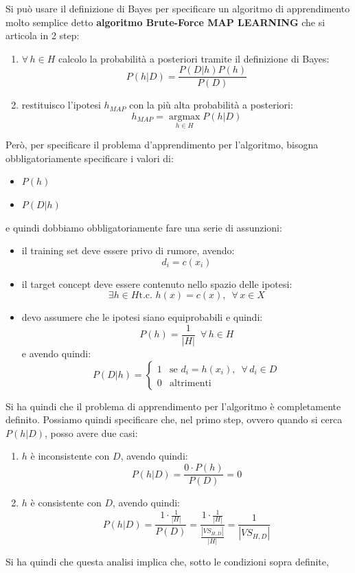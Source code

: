 Si può usare il definizione di Bayes per specificare un algoritmo di apprendimento
molto semplice detto \textbf{algoritmo Brute-Force MAP LEARNING} che si articola
in 2 step:
\begin{enumerate}
  \item $\forall\, h\in H$ calcolo la probabilità a posteriori tramite il definizione
  di Bayes:
  \[P(h|D)=\frac{P(D|h)P(h)}{P(D)}\]
  
  \item restituisco l'ipotesi $h_{MAP}$ con la più alta probabilità a
  posteriori:
  \[h_{MAP}=\operatorname*{argmax}_{h\in H}P(h|D)\]
\end{enumerate}
Però, per specificare il problema d'apprendimento per l'algoritmo, bisogna
obbligatoriamente specificare i valori di:
\begin{itemize}
  \item $P(h)$
  \item $P(D|h)$
\end{itemize}
e quindi dobbiamo obbligatoriamente fare una serie di assunzioni:
\begin{itemize}
  \item il training set deve essere privo di rumore, avendo:
  \[d_i=c(x_i)\]
  \item il target concept deve essere contenuto nello spazio delle ipotesi:
  \[\exists h\in H \mbox{t.c. }h(x)=c(x),\,\,\,\forall\, x\in X\]
  \item devo assumere che le ipotesi siano equiprobabili e quindi:
  \[P(h)=\frac{1}{|H|}\,\,\,\forall\, h\in H\]
  e avendo quindi:
  \[P(D|h)=
    \begin{cases}
      1&\mbox{se } d_i=h(x_i),\,\,\,\forall\, d_i\in D\\
      0&\mbox{altrimenti}
    \end{cases}
  \]
\end{itemize}
Si ha quindi che il problema di apprendimento per l'algoritmo è completamente
definito. Possiamo quindi specificare che, nel primo step, ovvero quando si
cerca $P(h|D)$, posso avere due casi:
\begin{enumerate}
  \item $h$ è inconsistente con $D$, avendo quindi:
  \[P(h|D)=\frac{0\cdot P(h)}{P(D)}=0\]
  \item $h$ è consistente con $D$, avendo quindi:
  \[P(h|D)=\frac{1\cdot \frac{1}{|H|}}{P(D)}=\frac{1\cdot
      \frac{1}{|H|}}{\frac{|VS_{H, D}|}{|H|}}=\frac{1}{|VS_{H, D}|}\] 
\end{enumerate}
Si ha quindi che questa analisi implica che, sotto le condizioni sopra definite,
